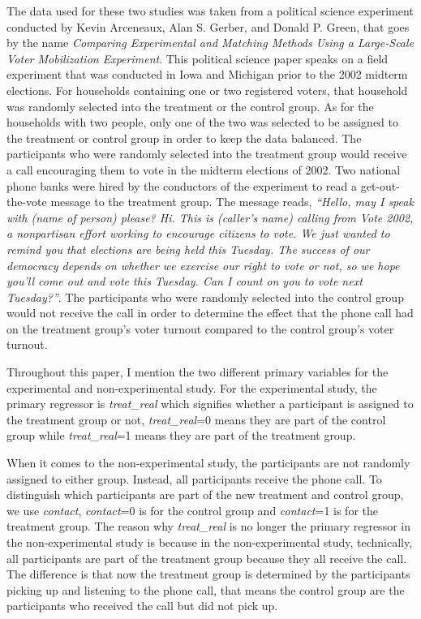\documentclass[a4paper]{article}
\begin{document}
The data used for these two studies was taken from a political science experiment conducted by Kevin Arceneaux, Alan S. Gerber, and Donald P. Green, that goes by the name \textit{Comparing Experimental and Matching Methods Using a Large-Scale Voter Mobilization Experiment}. This political science paper speaks on a field experiment that was conducted in Iowa and Michigan prior to the 2002 midterm elections. For households containing one or two registered voters, that household was randomly selected into the treatment or the control group. As for the households with two people, only one of the two was selected to be assigned to the treatment or control group in order to keep the data balanced. The participants who were randomly selected into the treatment group would receive a call encouraging them to vote in the midterm elections of 2002. Two national phone banks were hired by the conductors of the experiment to read a get-out-the-vote message to the treatment group. The message reads, \textit{“Hello, may I speak with (name of person) please? Hi. This is (caller’s name) calling from Vote 2002, a nonpartisan effort working to encourage citizens to vote. We just wanted to remind you that elections are being held this Tuesday. The success of our democracy depends on whether we exercise our right to vote or not, so we hope you’ll come out and vote this Tuesday. Can I count on you to vote next Tuesday?”}. The participants who were randomly selected into the control group would not receive the call in order to determine the effect that the phone call had on the treatment group's voter turnout compared to the control group's voter turnout. 


\begin{flushleft}
Throughout this paper, I mention the two different primary variables for the experimental and non-experimental study. For the experimental study, the primary regressor is \textit{treat\_real} which signifies whether a participant is assigned to the treatment group or not, \textit{treat\_real}=0 means they are part of the control group while \textit{treat\_real}=1 means they are part of the treatment group. 
\end{flushleft}
\begin{flushleft}
When it comes to the non-experimental study, the participants are not randomly assigned to either group. Instead, all participants receive the phone call. To distinguish which participants are part of the new treatment and control group, we use \textit{contact}, \textit{contact}=0 is for the control group and \textit{contact}=1 is for the treatment group.  The reason why \textit{treat\_real} is no longer the primary regressor in the non-experimental study is because in the non-experimental study, technically, all participants are part of the treatment group because they all receive the call. The difference is that now the treatment group is determined by the participants picking up and listening to the phone call, that means the control group are the participants who received the call but did not pick up. 
\end{flushleft}
\end{document}
